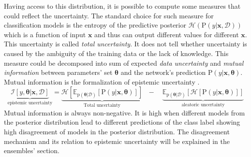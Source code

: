 \documentclass{article}
\begin{document}
Having access to this distribution, it is possible to compute some measures that could reflect the uncertainty.
The standard choice for such measure for classification models is the entropy of the predictive posterior $\mathcal{H} (\mathrm{P} (y | \boldsymbol{x}, \mathcal{D}))$ which is a function of input $\boldsymbol{x}$ and thus can output different values for different $\boldsymbol{x}$.
This uncertainty is called \textit{total uncertainty}.
It does not tell whether uncertainty is caused by the ambiguity of the training data or the lack of knowledge. This measure could be decomposed into sum of expected \textit{data uncertainty} and \textit{mutual information} between parameters' set $\boldsymbol{\theta}$ and the network's prediction $\mathrm{P} (y | \boldsymbol{x}, \boldsymbol{\theta})$. Mutual information is the formalization of epistemic uncertainty \cite{decomposition}.
\begin{equation}\label{eq:epistemic_definition}
\underbrace{\mathcal{I}[ y, \boldsymbol{\theta} | \boldsymbol{x}, \mathcal{D} ]}_{\textrm{epistemic uncertainty}} = \underbrace{\mathcal{H} [ \mathbb{E}_{\mathrm{p}(\boldsymbol{\theta} | \mathcal{D})} [\mathrm{P} (y | \boldsymbol{x}, \boldsymbol{\theta}) ]]}_{\textrm{Total uncertainty}} \,\,\,\, - \,\,\,\,\,\, \underbrace{\mathbb{E}_{\mathrm{p}(\boldsymbol{\theta} | \mathcal{D})} [\mathcal{H} [ \mathrm{P}(y | \boldsymbol{x}, \boldsymbol{\theta}) ]]}_{\textrm{aleatoric uncertainty}}
\end{equation}
Mutual information is always non-negative.
It is high when different models from the posterior distribution lead to different predictions of the class label showing high disagreement of models in the posterior distribution.
The disagreement mechanism and its relation to epistemic uncertainty will be explained in the ensembles' section.
\end{document}
